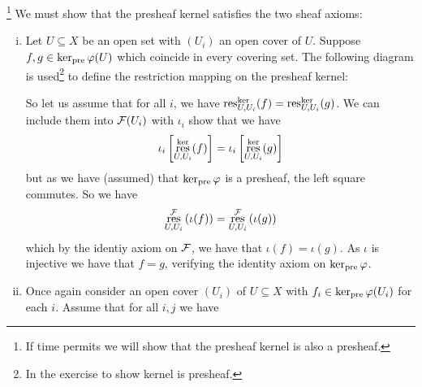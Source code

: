 \documentclass[12pt]{memoir}
\begin{document}
\begin{ptcbr}
    \footnote{If time permits we will show that the presheaf kernel is also a presheaf.} We must show that the presheaf kernel satisfies the two sheaf axioms:
    \begin{enumerate}[i)]
        \itemsep=-0.4em
        \item Let $U\subseteq X$ be an open set with $(U_i)$ an open cover of $U$. Suppose $f,g\in\ker_{\text{pre}}\varphi(U)$ which coincide in every covering set. The following diagram is used\footnote{In the exercise to show kernel is presheaf.} to define the restriction mapping on the presheaf kernel:
        \begin{center}
        \end{center}
        So let us assume that for all $i$, we have $\operatorname*{res}^{\ker}_{U,U_i}(f)=\operatorname*{res}^{\ker}_{U,U_i}(g)$. We can include them into $\mathcal{F}(U_i)$ with $\iota_i$ show that we have 
        $$\iota_i\left\lbrack\operatorname*{res}^{\ker}_{U,U_i}(f)\right\rbrack=\iota_i\left\lbrack\operatorname*{res}^{\ker}_{U,U_i}(g)\right\rbrack$$
        but as we have (assumed) that $\ker_{\text{pre}}\varphi$ is a presheaf, the left square commutes. So we have 
        $$\operatorname*{res}^{\mathcal{F}}_{U,U_i}\left(\iota(f)\right)=\operatorname*{res}^{\mathcal{F}}_{U,U_i}\left(\iota(g)\right)$$
        which by the identiy axiom on $\mathcal{F}$, we have that $\iota(f)=\iota(g)$. As $\iota$ is injective we have that $f=g$, verifying the identity axiom on $\ker_{\text{pre}}\varphi$.
        \item Once again consider an open cover $(U_i)$ of $U\subseteq X$ with $f_i\in \ker_{\text{pre}}\varphi(U_i)$ for each $i$. Assume that for all $i,j$ we have 

\end{enumerate}
\end{ptcbr}
\end{document}
